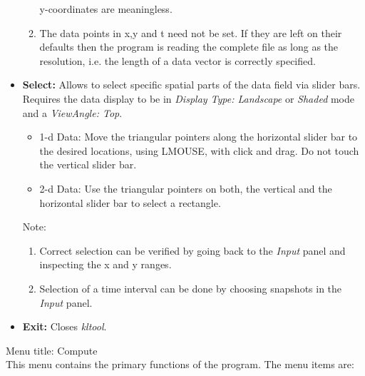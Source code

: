 \begin{description}
\begin{itemize}
\begin{enumerate}
	y-coordinates are meaningless. 
	\item The data points in x,y and t need not be set. If they are left
	on their defaults then the program is reading  the complete file
	as long as the resolution, i.e. the length of a data vector is 
	correctly specified.
	\end{enumerate}
\item {\bf Select:} 
	Allows to select specific spatial parts of the data field via slider
	bars. Requires the data display to be in {\sl Display Type: Landscape}
	or {\sl Shaded} mode and a {\sl ViewAngle: Top}. 
	\begin{itemize}
	\item{1-d Data:} Move the triangular pointers along the horizontal
	slider bar to the desired locations, using LMOUSE, with click and drag.
	Do not touch the vertical slider bar.
	\item{2-d Data:} Use the triangular pointers on both, 
	the vertical and the horizontal	slider bar to select a rectangle.
	\end{itemize}
	Note: 
	\begin{enumerate}
	\item Correct selection can be verified by going back to the
	{\sl Input} panel and inspecting the x and y ranges.
	\item Selection of a time interval can be done by choosing 
	snapshots in the {\sl Input} panel.
	\end{enumerate}
\item {\bf Exit:}  Closes {\sl kltool}.
\end{itemize}

\item{Menu title: {\large Compute}}\\
This menu contains the primary functions of the program.
The menu items are:
\begin{itemize}


\end{itemize}
\end{description}
